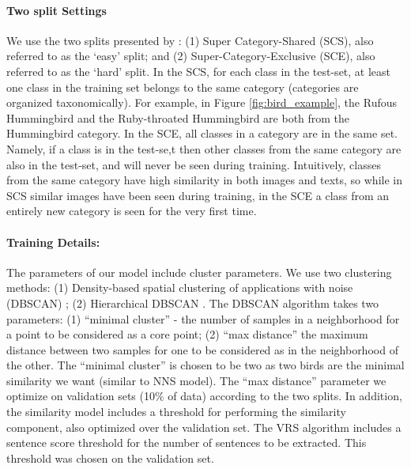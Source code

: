 \documentclass[11pt,a4paper]{article}
\begin{document}
\paragraph{Two split Settings} We use the two splits presented by \citet{elhoseiny2017link}: (1) Super Category-Shared (SCS), also referred to as the \enquote*{easy} split; and (2) Super-Category-Exclusive (SCE), also referred to as the \enquote*{hard} split. In the SCS, for each class in the test-set, at least one class in the training set belongs to the same category (categories are organized taxonomically). For example, in Figure \ref{fig:bird_example}, the Rufous Hummingbird and the Ruby-throated Hummingbird are both from the Hummingbird category. In the SCE, all classes in a category are in the same set. Namely, if a class is in the test-se,t then other classes from the same category are also in the test-set, and will never be seen during training. Intuitively, classes from the same category have high similarity in both images and texts, so while in SCS similar images have been seen during training, in the SCE a class from an entirely new category is seen for the very first time. %

\paragraph{Training Details:}
The parameters of our model include cluster parameters. We use two clustering methods: (1) Density-based spatial clustering of applications with noise (DBSCAN) \citep{ester1996density}; (2) Hierarchical DBSCAN \citep{mcinnes2017hdbscan}. The DBSCAN algorithm takes two parameters: (1) \enquote{minimal cluster} - the number of samples in a neighborhood for a point to be considered as a core point; (2) \enquote{max distance} the maximum distance between two samples for one to be considered as in the neighborhood of the other. 
The \enquote{minimal cluster} is chosen to be two as two birds are the minimal similarity we want (similar to NNS model).
The \enquote{max distance} parameter we optimize on validation sets (10\% of data) according to the two splits. In addition, the similarity model includes a threshold for performing the similarity component, also optimized over the validation set. 
The VRS algorithm includes a sentence score threshold for the number of sentences to be extracted. This threshold was chosen on the validation set.

\end{document}
